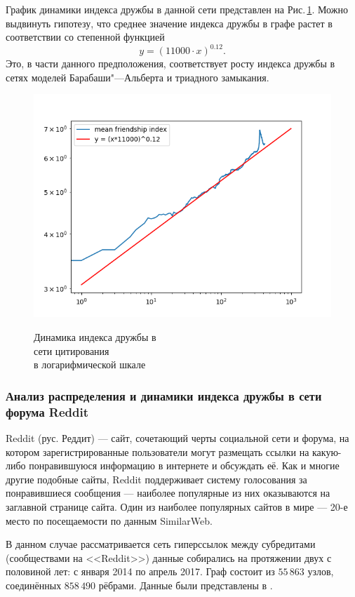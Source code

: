 \documentclass[bachelor, och, diploma]{SCWorks}
\begin{document}
График динамики индекса дружбы в данной сети представлен на Рис.\,\ref{fig:citd}. Можно выдвинуть гипотезу, что среднее значение индекса дружбы в графе растет в соответствии со степенной функцией 
\[
y = (11000 \cdot x)^{0.12}.
\]
Это, в части данного предположения, соответствует росту индекса дружбы в сетях моделей Барабаши"---Альберта и триадного замыкания.
\begin{figure}[!ht]
\centering
\includegraphics[scale=0.7]{diploma_results/dynamic_real_log/cit-HepPh_mean.png}\\
\caption{Динамика индекса дружбы  в\\ сети цитирования\\ в логарифмической шкале}\label{fig:citd}
\end{figure}

\subsubsection{Анализ распределения и динамики индекса дружбы в сети форума Reddit}
Reddit (рус. Реддит) — сайт, сочетающий черты социальной сети и форума, на котором зарегистрированные пользователи могут размещать ссылки на какую-либо понравившуюся информацию в интернете и обсуждать её. Как и многие другие подобные сайты, Reddit поддерживает систему голосования за понравившиеся сообщения — наиболее популярные из них оказываются на заглавной странице сайта. Один из наиболее популярных сайтов в мире — 20-е место по посещаемости по данным SimilarWeb. 

В данном случае рассматривается сеть гиперссылок между субредитами (сообществами на <<Reddit>>) данные собирались на протяжении двух с половиной лет: с января 2014 по апрель 2017. Граф состоит из $55\,863$ узлов, соединённых $858\,490$ рёбрами. Данные были представлены в \cite{reddit}.
\end{document}
